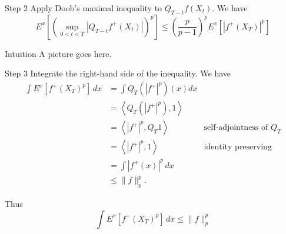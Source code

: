 \documentclass{if-beamer}
\begin{document}
\begin{frame}%
    \begin{block}{Step 2}
        Apply Doob's maximal inequality to $Q_{T - t} f(X_t)$. We have
        \begin{equation*}
            E^x\left[\left(\sup_{0 < t < T} |Q_{T - t} f^+(X_t)|\right)^p\right]
            \leq \left(\frac{p}{p-1}\right)^p E^x\left[|f^+(X_T)|^p\right]
        \end{equation*}
    \end{block}
    \begin{exampleblock}{Intuition}
        A picture goes here. %
    \end{exampleblock}

\end{frame}

\begin{frame}
    \begin{block}{Step 3}
        Integrate the right-hand side of the inequality. We have
        \begin{align*}
            \int E^x\left[ f^+(X_T)^p \right] \, dx 
            &= \int Q_T (|f^+|^p)(x) dx \\
            &= \left\langle Q_T(|f^+|^p), 1 \right\rangle \\
            &= \left\langle |f^+|^p, Q_T 1 \right\rangle & \text{self-adjointness of $Q_T$}\\
            &= \left\langle |f^+|^p, 1 \right\rangle & \text{identity preserving}\\
            &= \int |f^+(x)|^p \, dx \\
            &\leq \|f\|_p^p
        .\end{align*}
    \end{block}
    Thus
        \begin{equation*}
            \int E^x\left[ f^+(X_T)^p \right] \, dx \leq \|f\|_p^p
        \end{equation*}
\end{frame}
\end{document}

